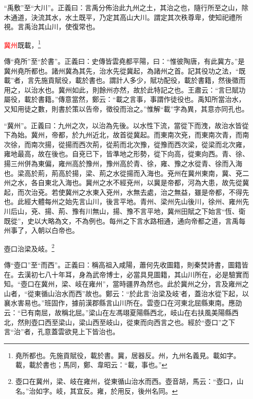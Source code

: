 {\noindent\shu{}\fzkt “禹敷”至“大川”。正義曰：言禹分佈治此九州之土，其治之也，隨行所至之山，除木通道，決流其水，水土既平，乃定其高山大川。謂定其次秩尊卑，使知祀禮所視。言禹治其山川，使復常也。 \par}

\textcolor{red}{冀州}既載，\footnote{堯所都也。先施貢賦役，載於書。冀，居器反。州，九州名義見。載如字。載，載於書也；馬同，鄭、韋昭云：“載，事也。”}

{\noindent\zhuan{}\fzbyks 傳“堯所”至“於書”。正義曰：史傳皆雲堯都平陽，曰：“惟彼陶唐，有此冀方。”是冀州堯所都也。諸州冀為其先，治水先從冀起，為諸州之首。記其役功之法，“既載”者，言先施貢賦役，載於書也。謂計人多少，賦功配役，載於書籍，然後徵而用之，以治水也。冀州如此，則餘州亦然，故於此特記之也。王肅云：“言巳賦功屬役，載於書籍。”傳意當然，鄭云：“載之言事，事謂作徒役也。禹知所當治水，又知用徒之數，則書於策以告帝，徵役而治之。”惟解“載”字為異，其意亦同孔也。 \par}

{\noindent\shu{}\fzkt “冀州”。正義曰：九州之次，以治為先後。以水性下流，當從下而洩，故治水皆從下為始。冀州，帝都，於九州近北，故首從冀起。而東南次兗，而東南次青，而南次徐，而南次揚，從揚而西次荊，從荊而北次豫，從豫而西次梁，從梁而北次雍，雍地最高，故在後也。自兗已下，皆準地之形勢，從下向高，從東向西。青、徐、揚三州併為東偏，雍州高於豫州，豫州高於青、徐，雍、豫之水從青、徐而入海也。梁高於荊，荊高於揚，梁、荊之水從揚而入海也。兗州在冀州東南，冀、兗二州之水，各自東北入海也。冀州之水不經兗州，以冀是帝都，河為大患，故先從冀起，而次治兗。若使冀州之水東入兗州，水無去處，治之無益，雖是帝都，不得先也。此經大體每州之始先言山川，後言平地。青州、梁州先山後川，徐州、雍州先川后山，兗、揚、荊、豫有川無山，揚、豫不言平地，冀州田賦之下始言“恆、衛既從”，史以大略為文，不為例也。每州之下言水路相通，通向帝都之道，言禹每州事了，入朝以白帝也。 \par}

壺口治梁及岐。\footnote{壺口在冀州，梁、岐在雍州，從東循山治水而西。壺音胡，馬云：“壺口，山名。”治如字。岐，其宜反。雍，於用反，後州名同。}

{\noindent\zhuan{}\fzbyks 傳“壺口”至“而西”。正義曰：稱高祖入咸陽，蕭何先收圖籍，則秦焚詩書，圖籍皆在。去漢初七八十年耳，身為武帝博士，必當具見圖籍，其山川所在，必是驗實而知。“壺口在冀州，梁、岐在雍州”，當時疆界為然也。此於冀州之分，言及雍州之山者，“從東循山治水而西”故也。鄭云：“於此言‘治梁及岐’者，蓋治水從下起，以襄水害易也。”班固作，據前漢郡縣言山川所在。雲壺口在河東北屈縣東南。應劭云：“已有南屈，故稱北屈。”梁山在左馮翊夏陽縣西北，岐山在右扶風美陽縣西北，然則壺口西至梁山，梁山西至岐山，從東而向西言之也。經於“壺口”之下言“治”者，孔意蓋雲欲見上下皆治也。 \par}

